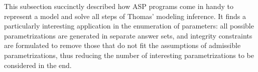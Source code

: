 \begin{comment}
We rely on integrity constraints to filter only admissible parametrizations.
An integrity constraint is a rule with no head, that makes an answer set unsatisfiable if its body turns out to be true.
Hence, if we suppose that:
\begin{itemize}
  \item the $\atom{less\_active}(a, p, q)$ atom means that $K^p_{a,\omega}$ stands for a configuration with less activating regulators than $K^q_{a,\omega'}$, %
  \item the $\atom{param\_inf}(a, p, q)$ atom means: $K^p_{a,\omega} \leqsegm K^q_{a,\omega'}$,
\end{itemize}
then the monotonicity assumption (\pref{pro:param_enum_monotonicity}) is formulated as the following integrity constraint:
$$\la \atom{less\_active}(\var{X}, \var{P}, \var{Q}), \nota \atom{param\_inf}(\var{X}, \var{P}, \var{Q}).$$
which removes all parametrization results where parameters $K^\var{P}_{\var{X},\omega}$ and $K^\var{Q}_{\var{X},\omega'}$ exist such that $\var{X}$ is less activated by $\omega$ than $\omega'$ %
but $K^\var{Q}_{\var{X},\omega'} \ltsegm K^\var{P}_{\var{X},\omega}$,
thus violating the monotonicity assumption.
Of course, other assumptions can be formulated in the same way.
\end{comment}



This subsection succinctly described how ASP programs come in handy to represent a model and solve all steps of Thomas' modeling inference.
It finds a particularly interesting application in the enumeration of parameters: all possible parametrizations are generated in separate answer sets, and integrity constraints are formulated to remove those that do not fit the assumptions of admissible parametrizations,
thus reducing the number of interesting parametrizations to be considered in the end.
